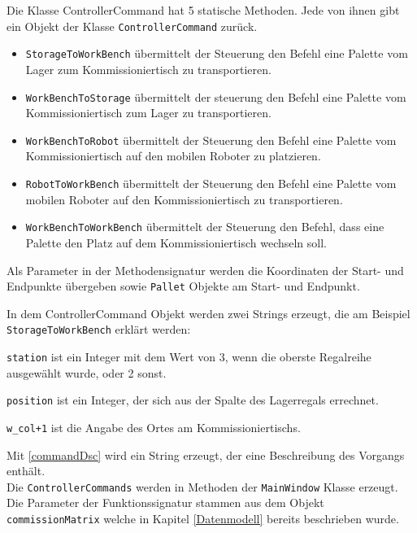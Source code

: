 Die Klasse ControllerCommand hat 5 statische Methoden.
Jede von ihnen gibt ein Objekt der Klasse \verb|ControllerCommand| zurück.
\begin{itemize}
    \item \verb|StorageToWorkBench| übermittelt der Steuerung den Befehl eine Palette vom Lager zum Kommissioniertisch
    zu transportieren.
    \item \verb|WorkBenchToStorage| übermittelt der steuerung den Befehl eine Palette vom Kommissioniertisch zum Lager
    zu transportieren.
    \item \verb|WorkBenchToRobot| übermittelt der Steuerung den Befehl eine Palette vom Kommissioniertisch auf den
    mobilen Roboter zu platzieren.
    \item \verb|RobotToWorkBench| übermittelt der Steuerung den Befehl eine Palette vom mobilen Roboter auf den
    Kommissioniertisch zu transportieren.
    \item \verb|WorkBenchToWorkBench| übermittelt der Steuerung den Befehl, dass eine Palette den Platz auf dem
    Kommissioniertisch wechseln soll.

\end{itemize}
Als Parameter in der Methodensignatur werden die Koordinaten der Start- und Endpunkte übergeben
sowie \verb|Pallet| Objekte am Start- und Endpunkt.

In dem ControllerCommand Objekt werden zwei Strings erzeugt, die am Beispiel\\
\verb|StorageToWorkBench| erklärt werden:
\newline


\verb|station| ist ein Integer mit dem Wert von 3, wenn die oberste Regalreihe ausgewählt wurde, oder 2 sonst.

\verb|position| ist ein Integer, der sich aus der Spalte des Lagerregals errechnet.

\verb|w_col+1| ist die Angabe des Ortes am Kommissioniertischs.





Mit \ref{commandDsc} wird ein String erzeugt, der eine Beschreibung des Vorgangs enthält.\\
Die \verb|ControllerCommands| werden in Methoden der \verb|MainWindow| Klasse erzeugt.
Die Parameter der Funktionssignatur stammen aus dem Objekt \verb|commissionMatrix| welche in Kapitel \ref{Datenmodell}
bereits beschrieben wurde.

